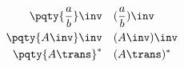 \[
\begin{aligned}
	\pqty{ \frac{a}{b} }\inv &\quad (\frac{a}{b})\inv
	\\
	\pqty{A\inv}\inv &\quad (A\inv)\inv
	\\
	\pqty{A\trans}^* &\quad (A\trans)^*
\end{aligned}
\]